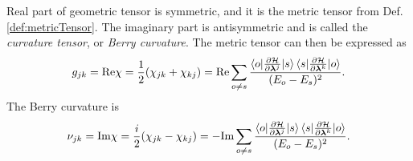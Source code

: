 Real part of geometric tensor is symmetric, and it is the metric tensor from Def. \ref{def:metricTensor}. The imaginary part is antisymmetric and is called the \emph{curvature tensor}, or \emph{Berry curvature}. The metric tensor can then be expressed as
\begin{equation}
    g_{jk} =\text{Re} \chi = \frac{1}{2}(\chi_{jk}+\chi_{kj}) = \text{Re} \sum_{o\neq s}\frac{\braket{o|\frac{\partial \mathcal{H}}{\partial {\bm\lambda}^j}|s}\braket{s|\frac{\partial \mathcal{H}}{\partial {\bm\lambda}^k}|o}}{(E_o-E_s)^2}.
    \label{eq:metrictensorREdefinition}
\end{equation}
The Berry curvature is
\begin{equation}
        \nu_{jk} =\textrm{Im} \chi= \frac{i}{2}(\chi_{jk}-\chi_{kj})=  - \textrm{Im} \sum_{o\neq s}\frac{\braket{o|\frac{\partial \mathcal{H}}{\partial {\bm\lambda}^j}|s}\braket{s|\frac{\partial \mathcal{H}}{\partial {\bm\lambda}^k}|o}}{(E_o-E_s)^2}.
    \label{eq:geomtensorREdefinition}
\end{equation}



